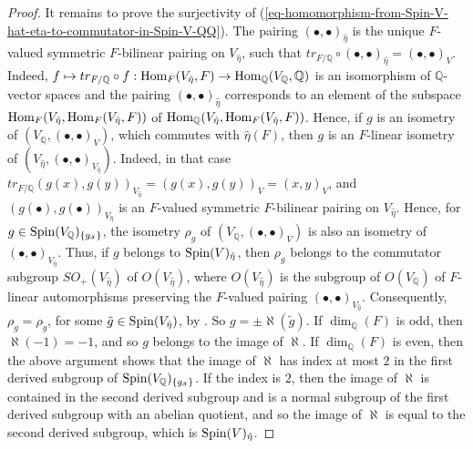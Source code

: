 \documentclass[12pt]{amsart}
\numberwithin{equation}{subsection}
\theoremstyle{plain}
\theoremstyle{definition}
\newcommand{\QQ}{{\mathbb Q}}
\newcommand{\RR}{{\mathbb R}}
\newcommand{\Spin}{{\rm Spin}}
\newcommand{\Hom}{{\rm Hom}}
\begin{document}
{\begin{proof}
It remains to prove the surjectivity of (\ref{eq-homomorphism-from-Spin-V-hat-eta-to-commutator-in-Spin-V-QQ}).
The pairing $(\bullet,\bullet)_{\hat{\eta}}$ is the unique $F$-valued symmetric $F$-bilinear pairing on $V_{\hat{\eta}}$, such that $tr_{F/\QQ}\circ (\bullet,\bullet)_{\hat{\eta}}=(\bullet,\bullet)_V$. Indeed, $f\mapsto tr_{F/\QQ}\circ f :\Hom_F(V_{\hat{\eta}},F)\rightarrow \Hom_\QQ(V_\QQ,\QQ)$ is an isomorphism of $\QQ$-vector spaces and the pairing $(\bullet,\bullet)_{\hat{\eta}}$ corresponds to an element of the subspace 
$\Hom_F(V_{\hat{\eta}},\Hom_F(V_{\hat{\eta}},F))$ of $\Hom_\QQ(V_{\hat{\eta}},\Hom_F(V_{\hat{\eta}},F))$. Hence, if $g$ is an isometry of $(V_\QQ,(\bullet,\bullet)_V)$, which commutes with $\hat{\eta}(F)$, then $g$ is an $F$-linear isometry of $(V_{\hat{\eta}},(\bullet,\bullet)_{V_{\hat{\eta}}})$. Indeed, in that case $tr_{F/\QQ}(g(x),g(y))_{V_{\hat{\eta}}}=(g(x),g(y))_V=(x,y)_V$, and 
$(g(\bullet),g(\bullet))_{V_{\hat{\eta}}}$ is an $F$-valued symmetric $F$-bilinear pairing on $V_{\hat{\eta}}$.
Hence, for $g\in \Spin(V_\QQ)_{\{g_{\hat{\sigma}}\}}$, the isometry $\rho_g$ of $(V_\QQ,(\bullet,\bullet)_V)$ is also an isometry of $(\bullet,\bullet)_{V_{\hat{\eta}}}$. Thus, if $g$ belongs to $\Spin(V)_{\hat{\eta}}$, then $\rho_g$ belongs to the commutator subgroup $SO_+(V_{\hat{\eta}})$ of $O(V_{\hat{\eta}})$,
where $O(V_{\hat{\eta}})$ is the subgroup of $O(V_\QQ)$ of $F$-linear automorphisms preserving the $F$-valued pairing $(\bullet,\bullet)_{V_{\hat{\eta}}}.$ 
Consequently, $\rho_g=\rho_{\tilde{g}}$, for some  $\tilde{g}\in\Spin(V_{\hat{\eta}})$, by \cite[II.3.8]{chevalley}. So $g=\pm\aleph(\tilde{g})$. 
If $\dim_\QQ(F)$ is odd, then $\aleph(-1)=-1$, and so $g$ belongs to the image of $\aleph$. 
If  $\dim_\QQ(F)$ is even, then the above argument shows that the image of $\aleph$ has index at most $2$ in the first derived subgroup of $\Spin(V_\QQ)_{\{g_{\hat{\sigma}}\}}$. If the index is $2$, then the image of $\aleph$ is contained in the second derived subgroup and is a normal subgroup of the first derived subgroup with an abelian quotient, and so the image of $\aleph$ is equal to the second derived subgroup, which is $\Spin(V)_{\hat{\eta}}$.
\end{proof}



}
\end{document}
